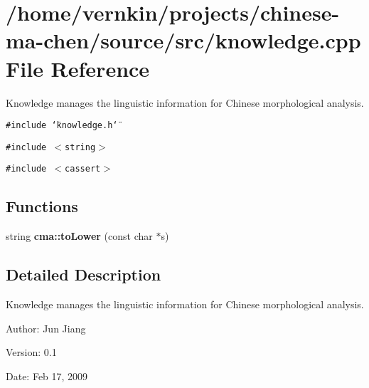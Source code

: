 \section{/home/vernkin/projects/chinese-ma-chen/source/src/knowledge.cpp File Reference}
\label{knowledge_8cpp}
Knowledge manages the linguistic information for Chinese morphological analysis.  


{\tt \#include \char`\"{}knowledge.h\char`\"{}}\par
{\tt \#include $<$string$>$}\par
{\tt \#include $<$cassert$>$}\par
\subsection*{Functions}
\begin{CompactItemize}
\item 
string {\bf cma::toLower} (const char $\ast$s)
\end{CompactItemize}


\subsection{Detailed Description}
Knowledge manages the linguistic information for Chinese morphological analysis. 

\begin{Desc}
\item[Author:]Jun Jiang \end{Desc}
\begin{Desc}
\item[Version:]0.1 \end{Desc}
\begin{Desc}
\item[Date:]Feb 17, 2009 \end{Desc}
